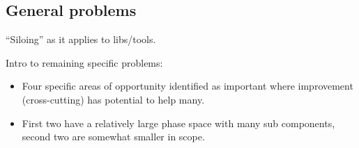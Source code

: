 \subsection{General problems}

``Siloing'' as it applies to libs/tools.

Intro to remaining specific problems:

\begin{itemize}
\item Four specific areas of opportunity identified as important where improvement (cross-cutting) has potential to help many.
\item First two have a relatively large phase space with many sub components, second two are somewhat smaller in scope.
\end{itemize}
